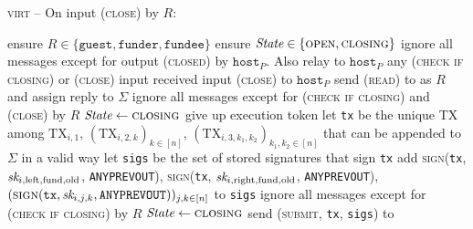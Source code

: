 \begin{center}
  \begin{processbox}{\textsc{virt} -- On input (\textsc{close}) by $R$:}
    \begin{algorithmic}[1]
      \State {}
      \State ensure $R  \in \{\texttt{guest}, \texttt{funder},
      \texttt{fundee}\}$
      \label{code:virtual-layer:close:output-guest-punished}
      \State ensure $\textit{State} \in \{\textsc{open}, \textsc{closing}\}$
       
      \label{code:virtual-layer:close:if-nested-host}
        \State ignore all messages except for output (\textsc{closed}) by
        $\texttt{host}_P$. Also relay to $\texttt{host}_P$ any (\textsc{check if
        closing}) or (\textsc{close}) input received
        \State input (\textsc{close}) to $\texttt{host}_P$
      \EndIf
      \State {}
      \State send (\textsc{read}) to \ledger as $R$ and assign reply to
      $\Sigma$
       
        \State ignore all messages except for (\textsc{check if closing}) and
        (\textsc{close}) by $R$
        \State $\textit{State} \gets \textsc{closing}$
        \State give up execution token 
      \EndIf
      \State let \texttt{tx} be the unique TX among $\mathrm{TX}_{i, 1}$,
      $(\mathrm{TX}_{i, 2, k})_{k \in [n]}$, $(\mathrm{TX}_{i, 3, k_1,
      k_2})_{k_1, k_2 \in [n]}$ that can be appended to $\Sigma$ in a valid way
      \label{code:virtual-layer:close:tx}
      \State let \texttt{sigs} be the set of stored signatures that sign
      \texttt{tx}
      \State add \textsc{sign}(\texttt{tx}, $\textit{sk}_{i, \mathrm{left},
      \mathrm{fund}, \mathrm{old}}$, \texttt{ANYPREVOUT}),
      \textsc{sign}(\texttt{tx}, $\textit{sk}_{i, \mathrm{right}, \mathrm{fund},
      \mathrm{old}}$, \texttt{ANYPREVOUT}), $(\textsc{sign}(\texttt{tx}, \textit{sk}_{i,
      j, k}, \texttt{ANYPREVOUT}))_{j, k \in [n]}$ to \texttt{sigs}
      \State ignore all messages except for (\textsc{check if closing}) by $R$
      \State $\textit{State} \gets \textsc{closing}$
      \State send (\textsc{submit}, \texttt{tx}, \texttt{sigs}) to \ledger
    \end{algorithmic}
  \end{processbox}
  \label{code:virtual-layer:close}
\end{center} \ \\

